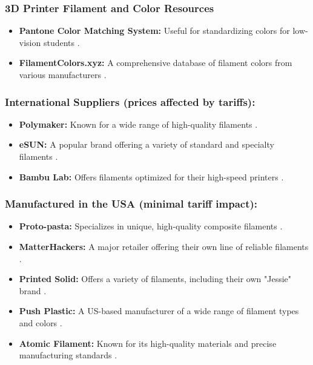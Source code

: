 \subsubsection{3D Printer Filament and Color Resources}
\begin{itemize}
	\item \textbf{Pantone Color Matching System:} Useful for standardizing colors for low-vision students \supercite{Pantone}.
	\item \textbf{FilamentColors.xyz:} A comprehensive database of filament colors from various manufacturers \supercite{FilamentColors}.
\end{itemize}

\subsubsection{International Suppliers (prices affected by tariffs):}
\begin{itemize}
	\item \textbf{Polymaker:} Known for a wide range of high-quality filaments \supercite{Polymaker}.
	\item \textbf{eSUN:} A popular brand offering a variety of standard and specialty filaments \supercite{eSUN}.
	\item \textbf{Bambu Lab:} Offers filaments optimized for their high-speed printers \supercite{BambuLab}.
\end{itemize}

\subsubsection{Manufactured in the USA (minimal tariff impact):}
\begin{itemize}
	\item \textbf{Proto-pasta:} Specializes in unique, high-quality composite filaments \supercite{ProtoPasta}.
	\item \textbf{MatterHackers:} A major retailer offering their own line of reliable filaments \supercite{MatterHackers}.
	\item \textbf{Printed Solid:} Offers a variety of filaments, including their own "Jessie" brand \supercite{PrintedSolid}.
	\item \textbf{Push Plastic:} A US-based manufacturer of a wide range of filament types and colors \supercite{PushPlastic}.
	\item \textbf{Atomic Filament:} Known for its high-quality materials and precise manufacturing standards \supercite{AtomicFilament}.
\end{itemize}

